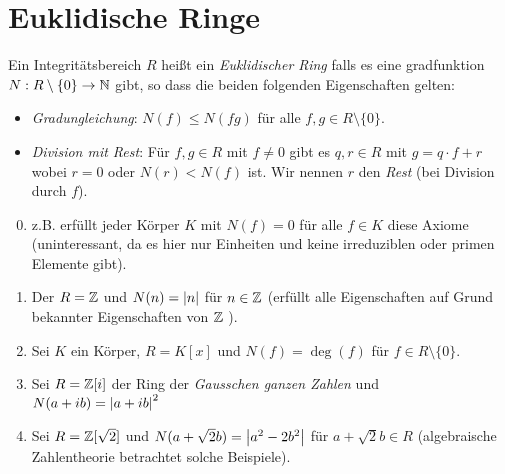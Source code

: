 \section{Euklidische Ringe}
\begin{definition}
	Ein Integritätsbereich $R$ heißt ein \emph{Euklidischer Ring} falls es eine gradfunktion $N: R \setminus \{0\}  \to \mathbb{N}$ gibt,
	so dass die beiden folgenden Eigenschaften gelten:
	\begin{itemize}
		\item \emph{Gradungleichung}: $N(f) \leq N(fg)$ für alle $f,g \in R \setminus \{0\} $.
		\item \emph{Division mit Rest}: Für $f,g \in R$ mit $f \neq  0$ gibt es $q,r \in R$ mit $g = q\cdot f + r$ wobei $r = 0$ oder $N(r) < N(f)$ ist.
			Wir nennen $r$ den \emph{Rest} (bei Division durch $f $).
	\end{itemize}
\end{definition}

\begin{eg}
	\begin{enumerate}[1)]
		\setcounter{enumi}{-1}
		\item z.B. erfüllt jeder Körper $K$ mit $N(f) = 0$ für alle $f \in K$ diese Axiome
			(uninteressant, da es hier nur Einheiten und keine irreduziblen oder primen Elemente gibt).
		\item Der $R = \mathbb{Z}$ und $N(n) = \abs{n}$ für $n \in \mathbb{Z}$ (erfüllt alle Eigenschaften auf Grund bekannter Eigenschaften von $\mathbb{Z}$ ).
		\item Sei  $K$ ein Körper, $R=K[x]$ und $N(f) = \deg(f)$ für $f \in R \setminus \{0\} $.
		\item Sei $R = \mathbb{Z}[i]$ der Ring der \emph{Gausschen ganzen Zahlen} und $N(a+ib) = \abs{a+ib}^2$
		\item Sei $R = \mathbb{Z}[\sqrt{2}]$ und $N(a + \sqrt{2} b) = \abs{a^2 - 2 b^2}$ für $a + \sqrt{2} b \in R$ (algebraische Zahlentheorie betrachtet solche Beispiele).
	\end{enumerate}
\end{eg}

